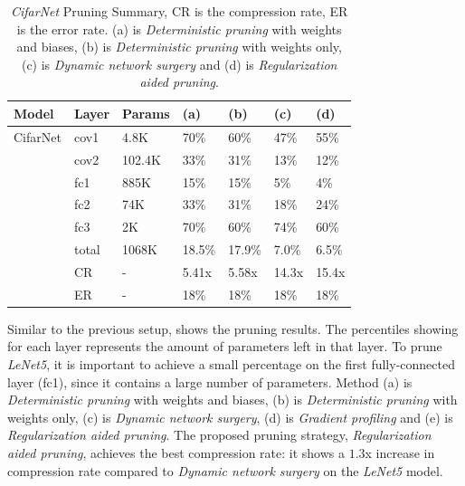 \documentclass[a4paper,12pt]{report}
\begin{document}
\begin{table}[!h]
  \centering
  \begin{tabular}{lllllll}
    \hline
    Model   &Layer     &Params    &(a)  &(b)      &(c) &(d)  \\
    \hline
    CifarNet  &cov1     &4.8K     &70\%   &60\%   &47\% &55\%\\
            &cov2     &102.4K     &33\%   &31\%   &13\% &12\%\\
            &fc1      &885K       &15\%   &15\%   &5\% &4\%\\
            &fc2      &74K        &33\%   &31\%   &18\% &24\%\\
            &fc3      &2K         &70\%   &60\%   &74\% &60\%\\
            &total    &1068K      &18.5\%  &17.9\%  &7.0\% &6.5\%\\
    \hline

            &CR       &-          &5.41x   &5.58x  &14.3x   &15.4x\\
            &ER       &-          &18\%   &18\%  &18\%   &18\%\\
    \hline
  \end{tabular}
  \caption{\textit{CifarNet} Pruning Summary, CR is the compression
  rate, ER is the error rate. (a) is \textit{Deterministic pruning} with weights and biases, (b) is
  \textit{Deterministic pruning} with weights only, (c) is \textit{Dynamic network surgery}
  and (d) is \textit{Regularization aided pruning}.}
  \label{fig:cifar_prune_new_summary}
\end{table}
Similar to the previous setup,  shows the pruning
results.
The percentiles showing for each layer represents the amount of
parameters left in that layer.
To prune \textit{LeNet5}, it is important to achieve a small percentage on
the first fully-connected layer (fc1), since it contains a large number of
parameters.
Method (a) is \textit{Deterministic pruning} with weights and biases, (b) is
\textit{Deterministic pruning} with weights only, (c) is \textit{Dynamic network surgery},
(d) is \textit{Gradient profiling} and (e) is
\textit{Regularization aided pruning}.
The proposed pruning strategy, \textit{Regularization aided pruning}, achieves
the best compression rate: it shows a $1.3$x increase in compression rate compared
to \textit{Dynamic network surgery} on the \textit{LeNet5} model.
\end{document}
